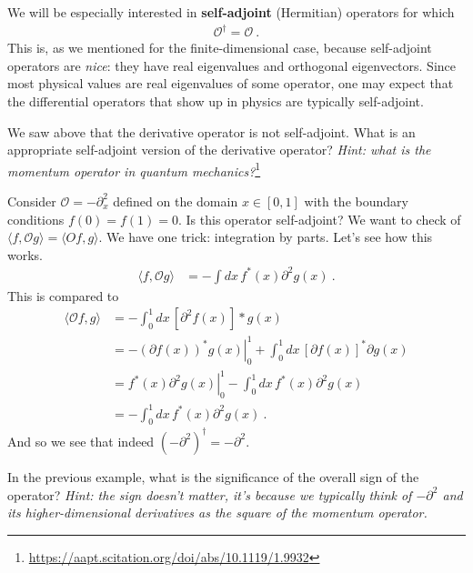 We will be especially interested in \textbf{self-adjoint} (Hermitian) operators for which
\begin{align}
	\mathcal O^\dag = \mathcal O \ .
\end{align}
This is, as we mentioned for the finite-dimensional case, because self-adjoint operators are \emph{nice}: they have real eigenvalues and orthogonal eigenvectors. Since most physical values are real eigenvalues of some operator, one may expect that the differential operators that show up in physics are typically self-adjoint.
\begin{exercise}
We saw above that the derivative operator is not self-adjoint. What is an appropriate self-adjoint version of the derivative operator? \emph{Hint: what is the momentum operator in quantum mechanics?}\footnote{\url{https://aapt.scitation.org/doi/abs/10.1119/1.9932}} 
\end{exercise}
\begin{example}
Consider $\mathcal O = -\partial_x^2$ defined on the domain $x\in [0,1]$ with the boundary conditions $f(0)=f(1)=0$. Is this operator self-adjoint? We want to check of $\langle f,\mathcal O g\rangle = \langle O f, g \rangle$. We have one trick: integration by parts. Let's see how this works.
\begin{align}
	\langle f, \mathcal O g\rangle &= - \int dx\, f^*(x)\partial^2 g(x) \ .
\end{align}
This is compared to
\begin{align}
	\langle \mathcal O f, g\rangle 
	&= -\int^1_0 dx\, \left[\partial^2 f(x)\right]*g(x) 
	\\
	&= 
	-\left.\left(\partial f(x)\right)^*g(x)\right|^1_0
	+ \int^1_0 dx \, \left[\partial f(x)\right]^* \partial g(x) 
	\\
	&= \left.f^*(x)\partial^2 g(x)\right|^1_0
	- \int^1_0 dx \, f^*(x) \partial^2 g(x)  
	\\
	&=
	- \int^1_0 dx \, f^*(x) \partial^2 g(x)  
	\ .
\end{align}
And so we see that indeed $(-\partial^2)^\dag = -\partial^2$.
\end{example}
\begin{exercise}
In the previous example, what is the significance of the overall sign of the operator? \emph{Hint: the sign doesn't matter, it's because we typically think of $-\partial^2$ and its higher-dimensional derivatives as the square of the momentum operator.}
\end{exercise}
